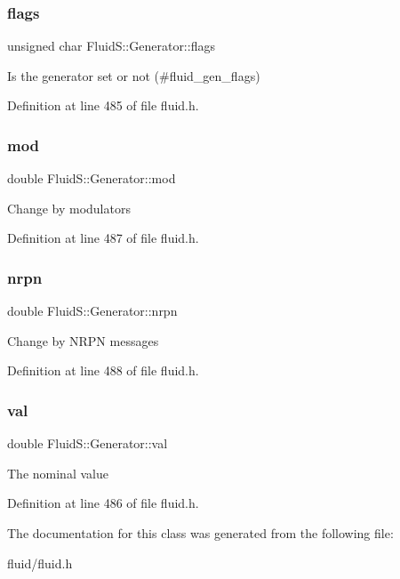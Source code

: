 \subsubsection{\texorpdfstring{flags}{flags}}
{\footnotesize\ttfamily unsigned char Fluid\+S\+::\+Generator\+::flags}

Is the generator set or not (\#fluid\+\_\+gen\+\_\+flags) 

Definition at line 485 of file fluid.\+h.

\mbox{\label{class_fluid_s_1_1_generator_aa2862594d10fb4fb6fc7dc12c23f008a}} 
\subsubsection{\texorpdfstring{mod}{mod}}
{\footnotesize\ttfamily double Fluid\+S\+::\+Generator\+::mod}

Change by modulators 

Definition at line 487 of file fluid.\+h.

\mbox{\label{class_fluid_s_1_1_generator_a344988fb2ebddced302de4c1e1b4fea8}} 
\subsubsection{\texorpdfstring{nrpn}{nrpn}}
{\footnotesize\ttfamily double Fluid\+S\+::\+Generator\+::nrpn}

Change by N\+R\+PN messages 

Definition at line 488 of file fluid.\+h.

\mbox{\label{class_fluid_s_1_1_generator_a78dcb7e1ea517959ec701058a8376c10}} 
\subsubsection{\texorpdfstring{val}{val}}
{\footnotesize\ttfamily double Fluid\+S\+::\+Generator\+::val}

The nominal value 

Definition at line 486 of file fluid.\+h.



The documentation for this class was generated from the following file\+:\begin{DoxyCompactItemize}
\item 
fluid/fluid.\+h\end{DoxyCompactItemize}
